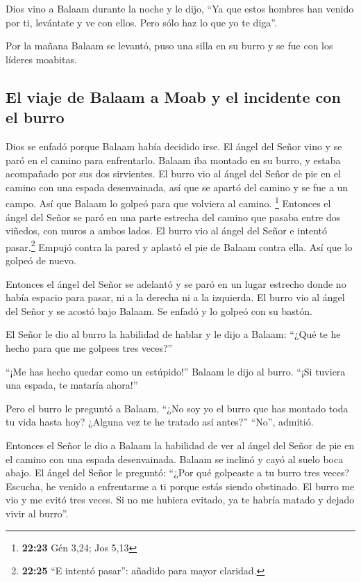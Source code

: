  Dios vino a Balaam durante la noche y le dijo, ``Ya que
estos hombres han venido por ti, levántate y ve con ellos. Pero sólo haz
lo que yo te diga''.

 Por la mañana Balaam se levantó, puso una silla en su
burro y se fue con los líderes moabitas.

\hypertarget{el-viaje-de-balaam-a-moab-y-el-incidente-con-el-burro}{%
\subsection{El viaje de Balaam a Moab y el incidente con el
burro}\label{el-viaje-de-balaam-a-moab-y-el-incidente-con-el-burro}}

 Dios se enfadó porque Balaam había decidido irse. El
ángel del Señor vino y se paró en el camino para enfrentarlo. Balaam iba
montado en su burro, y estaba acompañado por sus dos sirvientes.
 El burro vio al ángel del Señor de pie en el camino con
una espada desenvainada, así que se apartó del camino y se fue a un
campo. Así que Balaam lo golpeó para que volviera al camino. \footnote{\textbf{22:23}
  Gén 3,24; Jos 5,13}  Entonces el ángel del Señor se
paró en una parte estrecha del camino que pasaba entre dos viñedos, con
muros a ambos lados.  El burro vio al ángel del Señor e
intentó pasar.\footnote{\textbf{22:25} ``E intentó pasar'': añadido para
  mayor claridad.} Empujó contra la pared y aplastó el pie de Balaam
contra ella. Así que lo golpeó de nuevo.

 Entonces el ángel del Señor se adelantó y se paró en un
lugar estrecho donde no había espacio para pasar, ni a la derecha ni a
la izquierda.  El burro vio al ángel del Señor y se
acostó bajo Balaam. Se enfadó y lo golpeó con su bastón.

 El Señor le dio al burro la habilidad de hablar y le
dijo a Balaam: ``¿Qué te he hecho para que me golpees tres veces?''

 ``¡Me has hecho quedar como un estúpido!'' Balaam le
dijo al burro. ``¡Si tuviera una espada, te mataría ahora!''

 Pero el burro le preguntó a Balaam, ``¿No soy yo el
burro que has montado toda tu vida hasta hoy? ¿Alguna vez te he tratado
así antes?'' ``No'', admitió.

 Entonces el Señor le dio a Balaam la habilidad de ver al
ángel del Señor de pie en el camino con una espada desenvainada. Balaam
se inclinó y cayó al suelo boca abajo.  El ángel del
Señor le preguntó: ``¿Por qué golpeaste a tu burro tres veces? Escucha,
he venido a enfrentarme a ti porque estás siendo obstinado.
 El burro me vio y me evitó tres veces. Si no me hubiera
evitado, ya te habría matado y dejado vivir al burro''.

